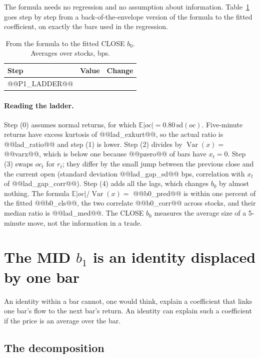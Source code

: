 \documentclass[11pt,a4paper]{article}
\newcommand{\E}{\mathbb{E}}
\begin{document}
The formula needs no regression and no assumption about information. Table~\ref{tab:ladder} goes step
by step from a back-of-the-envelope version of the formula to the fitted coefficient, on exactly the
bars used in the regression.

\begin{table}[htbp]
\centering
\caption{From the formula to the fitted CLOSE $b_0$. Averages over stocks, bps.}
\label{tab:ladder}
\small
\begin{tabular}{@{}lrr@{}}
\toprule
Step & Value & Change \\
\midrule
@@P1_LADDER@@
\bottomrule
\end{tabular}
\end{table}

\paragraph{Reading the ladder.} Step (0) assumes normal returns, for which $\E|oc|=0.80\,\mathrm{sd}(oc)$.
Five-minute returns have excess kurtosis of @@lad_exkurt@@, so the actual ratio is @@lad_ratio@@ and step (1)
is lower. Step (2) divides by $\operatorname{Var}(x)=$ @@varx@@, which is below one because @@pzero@@ of bars
have $x_t=0$. Step (3) swaps $oc_t$ for $r_t$; they differ by the small jump between the previous close
and the current open (standard deviation @@lad_gap_sd@@ bps, correlation with $x_t$ of @@lad_gap_corr@@).
Step (4) adds all the lags, which changes $b_0$ by almost nothing. The formula
$\E|oc|/\operatorname{Var}(x)=$ @@b0_pred@@ is within one percent of the fitted @@b0_cls@@, the two
correlate @@b0_corr@@ across stocks, and their median ratio is @@lad_med@@. The CLOSE $b_0$ measures the
average size of a 5-minute move, not the information in a trade.

\section{The MID $b_1$ is an identity displaced by one bar}
\label{sec:b1}

An identity within a bar cannot, one would think, explain a coefficient that links one bar's flow to
the next bar's return. An identity can explain such a coefficient if the price is an average over the bar.

\subsection{The decomposition}
\end{document}
